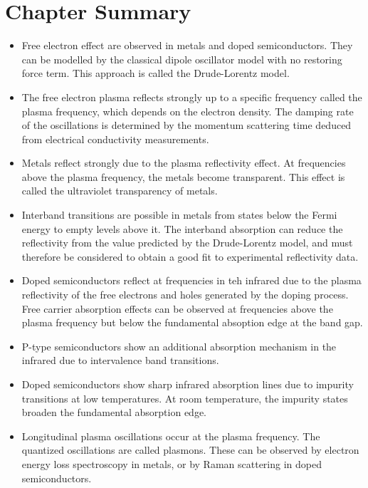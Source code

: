 \documentclass[12pt]{book}
\begin{document}
{\section*{Chapter Summary}
\begin{shaded}
\begin{itemize}
  \item Free electron effect are observed in metals and doped semiconductors. They can be modelled by the classical dipole oscillator model with no restoring force term. This approach is called the Drude-Lorentz model.
  \item The free electron plasma reflects strongly up to a specific frequency called the plasma frequency, which depends on the electron density. The damping rate of the oscillations is determined by the momentum scattering time deduced from electrical conductivity measurements.
  \item Metals reflect strongly due to the plasma  reflectivity effect. At frequencies above the plasma frequency, the metals become transparent. This effect is called the ultraviolet transparency of metals.
  \item Interband transitions are possible in metals from states below the Fermi energy to empty levels above it. The interband absorption can reduce the reflectivity from the value predicted by the Drude-Lorentz model, and must therefore be considered to obtain a good fit to experimental reflectivity data.
  \item Doped semiconductors reflect at frequencies in teh infrared due to the plasma reflectivity of the free electrons and holes generated by the doping process. Free carrier absorption effects can be observed at frequencies above the plasma frequency but below the fundamental absoption edge at the band gap.
  \item P-type semiconductors show an additional absorption mechanism in the infrared due to intervalence band transitions.
  \item Doped semiconductors show sharp infrared absorption lines due to impurity transitions at low temperatures. At room temperature, the impurity states broaden the fundamental absorption edge.
  \item Longitudinal plasma oscillations occur at the plasma frequency. The quantized oscillations  are called plasmons. These can be observed by electron energy loss spectroscopy in metals, or by Raman scattering in doped semiconductors.
\end{itemize}
\end{shaded}

}
\end{document}
